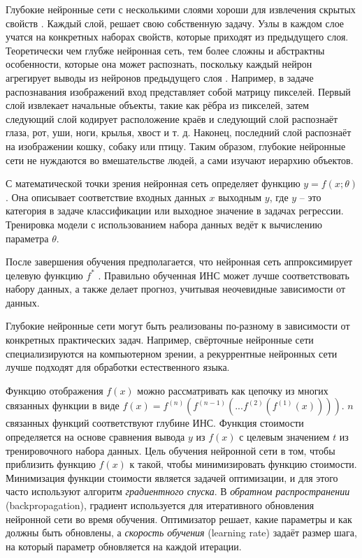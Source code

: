Глубокие нейронные сети с несколькими слоями хороши для извлечения скрытых свойств \cite{7344858}. Каждый слой, решает свою собственную задачу. Узлы в каждом слое учатся на конкретных наборах свойств, которые приходят из предыдущего слоя. Теоретически чем глубже нейронная сеть, тем более сложны и абстрактны особенности, которые она может распознать, поскольку каждый нейрон агрегирует выводы из нейронов предыдущего слоя \cite{bengio2012representation}. Например, в задаче распознавания изображений вход представляет собой матрицу пикселей. Первый слой извлекает начальные объекты, такие как рёбра из пикселей, затем следующий слой кодирует расположение краёв и следующий слой распознаёт глаза, рот, уши, ноги, крылья, хвост и т. д. Наконец, последний слой распознаёт на изображении кошку, собаку или птицу. Таким образом, глубокие нейронные сети не нуждаются во вмешательстве людей, а сами изучают иерархию объектов.

С математической точки зрения нейронная сеть определяет функцию ${y = f(x; \theta)}$. Она описывает соответствие входных данных ${x}$ выходным ${y}$, где ${y}$ -- это категория в задаче классификации или выходное значение в задачах регрессии. Тренировка модели с использованием набора данных ведёт к вычислению параметра {$\theta$}.

После завершения обучения предполагается, что нейронная сеть аппроксимирует целевую функцию ${f^*}$ \cite{Goodfellow-et-al-2016}. Правильно обученная ИНС может лучше соответствовать набору данных, а также делает прогноз, учитывая неочевидные зависимости от данных.

Глубокие нейронные сети могут быть реализованы по-разному в зависимости от конкретных практических задач. Например, свёрточные нейронные сети специализируются на компьютерном зрении, а рекуррентные нейронных сети лучше подходят для обработки естественного языка.

Функцию отображения ${f(x)}$ можно рассматривать как цепочку из многих связанных функции в виде  ${f(x) = f^{(n)}(f^{(n-1)}(...f^{(2)}(f^{(1)}(x))))}$. ${n}$ связанных функций соответствуют глубине ИНС. Функция стоимости определяется на основе сравнения вывода ${y}$ из ${f(x)}$ с целевым значением ${t}$ из тренировочного набора данных. Цель обучения нейронной сети в том, чтобы приблизить функцию ${f(x)}$ к такой, чтобы минимизировать функцию стоимости. Минимизация функции стоимости является задачей оптимизации, и для этого часто используют алгоритм {\itshape градиентного спуска}. В {\itshape обратном распространении} (backpropagation), градиент используется для итеративного обновления нейронной сети во время обучения. Оптимизатор решает, какие параметры и как должны быть обновлены, а {\itshape скорость обучения} (learning rate) задаёт размер шага, на который параметр обновляется на каждой итерации.
